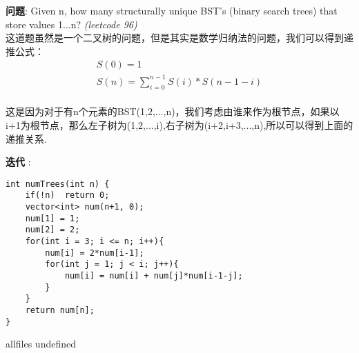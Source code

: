 \documentclass{article}
\begin{document}
\begin{CJK}{UTF8}{gbsn}     %

\else
	
\begin{description}
	\item{\textbf{问题}}: Given n, how many structurally unique BST's (binary search trees) that store values 1...n? \textit{(leetcode 96)}
	\\这道题虽然是一个二叉树的问题，但是其实是数学归纳法的问题，我们可以得到递推公式：
	\begin{equation}
	\begin{split}
	S(0) = 1
	\\S(n) = \sum_{i = 0}^{n - 1}{S(i)*S(n-1-i)}
	\end{split}
	\end{equation}
	\\这是因为对于有n个元素的BST(1,2,...,n)，我们考虑由谁来作为根节点，如果以i+1为根节点，那么左子树为(1,2,...,i),右子树为(i+2,i+3,...,n),所以可以得到上面的递推关系.
	\item{\textbf{迭代}} : 
	\begin{lstlisting}
int numTrees(int n) {
	if(!n)	return 0;
	vector<int> num(n+1, 0);
	num[1] = 1;
	num[2] = 2;
	for(int i = 3; i <= n; i++){
		num[i] = 2*num[i-1];
		for(int j = 1; j < i; j++){
			num[i] = num[i] + num[j]*num[i-1-j];
		}
	}
	return num[n];
}
	\end{lstlisting}
	\textit{}
\end{description}

\fi

\ifx allfiles undefined
\end{CJK}
\end{document}
